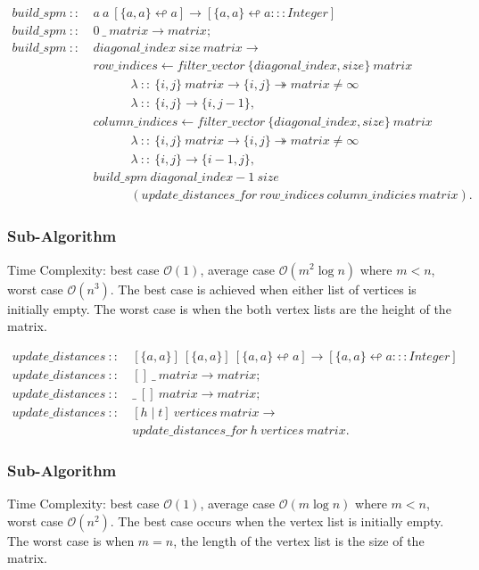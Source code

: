 \documentclass[a4paper,10pt]{book}
\newcommand\f{\textit{f}}
\begin{document}
\begin{align*}
build\_spm\ ::\ &a\ a\ [\{a,a\}\looparrowleft a]\rightarrow [\{a,a\}\looparrowleft a:::Integer]\\
build\_spm\ ::\ &0\ \_\ matrix\rightarrow matrix;\\
build\_spm\ ::\ &diagonal\_index\ size\ matrix\rightarrow\\
	&row\_indices\leftarrow \f ilter\_vector\ \{diagonal\_index,size\}\ matrix\\
	&\qquad\quad\lambda\ ::\ \{i,j\}\ matrix\rightarrow \{i,j\}\twoheadrightarrow matrix \ne\infty\\
	&\qquad\quad\lambda\ ::\ \{i,j\}\rightarrow \{i,j-1\},\\
	&column\_indices\leftarrow \f ilter\_vector\ \{diagonal\_index,size\}\ matrix\\
	&\qquad\quad\lambda\ ::\ \{i,j\}\ matrix\rightarrow \{i,j\}\twoheadrightarrow matrix \ne\infty\\
	&\qquad\quad\lambda\ ::\ \{i,j\}\rightarrow \{i-1,j\},\\
	&build\_spm\ diagonal\_index-1\ size\\
	&\qquad\quad(update\_distances\_for\ row\_indices\ column\_indicies\ matrix).
\end{align*}

\subsubsection{Sub-Algorithm}
Time Complexity: best case $\mathcal{O}(1)$, average case $\mathcal{O}(m^2\log n)$ where $m<n$, worst case $\mathcal{O}(n^3)$. The best case is achieved when either list of vertices is initially empty. The worst case is when the both vertex lists are the height of the matrix.

\begin{align*}
update\_distances\ ::\ &[\{a,a\}]\ [\{a,a\}]\ [\{a,a\}\looparrowleft a]\rightarrow [\{a,a\}\looparrowleft a:::Integer]\\
update\_distances\ ::\ &[]\ \_\ matrix\rightarrow matrix;\\
update\_distances\ ::\ &\_\ []\ matrix\rightarrow matrix;\\
update\_distances\ ::\ &[h\mid t]\ vertices\ matrix\rightarrow\\
	&update\_distances\_for\ h\ vertices\ matrix.
\end{align*}

\subsubsection{Sub-Algorithm}
Time Complexity: best case $\mathcal{O}(1)$, average case $\mathcal{O}(m\log n)$ where $m<n$, worst case $\mathcal{O}(n^2)$. The best case occurs when the vertex list is initially empty. The worst case is when $m=n$, the length of the vertex list is the size of the matrix.
\end{document}
